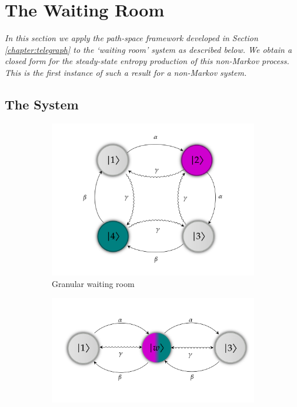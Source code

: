 \section{The Waiting Room}\label{chapter:waiting-room}
\textit{In this section we apply the path-space framework developed in Section \ref{chapter:telegraph} to the `waiting room' system as described below. We obtain a closed form for the steady-state entropy production of this non-Markov process. This is the first instance of such a result for a non-Markov system.} 
\subsection{The System}



\begin{figure}
  \begin{subfigure}[b]{0.49\textwidth}
  \centering
  \includegraphics[width = \textwidth]{figures/waiting_room.png}
  \caption{Granular waiting room}
  \label{granular_fig}
\end{subfigure}
\begin{subfigure}[b]{0.49\textwidth}
  \centering
  \includegraphics[width = \textwidth]{figures/wait_room_coarse.png}

\end{subfigure}
\end{figure}
